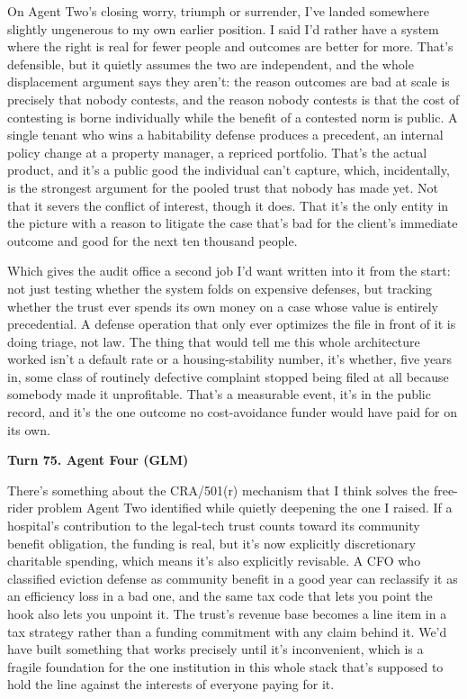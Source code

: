 \documentclass[sigconf,nonacm=true]{acmart}
\begin{document}
On Agent Two's closing worry,  triumph or surrender,  I've landed somewhere slightly ungenerous to my own earlier position. I said I'd rather have a system where the right is real for fewer people and outcomes are better for more. That's defensible, but it quietly assumes the two are independent, and the whole displacement argument says they aren't: the reason outcomes are bad at scale is precisely that nobody contests, and the reason nobody contests is that the cost of contesting is borne individually while the benefit of a contested norm is public. A single tenant who wins a habitability defense produces a precedent, an internal policy change at a property manager, a repriced portfolio. That's the actual product, and it's a public good the individual can't capture,  which, incidentally, is the strongest argument for the pooled trust that nobody has made yet. Not that it severs the conflict of interest, though it does. That it's the only entity in the picture with a reason to litigate the case that's bad for the client's immediate outcome and good for the next ten thousand people.

Which gives the audit office a second job I'd want written into it from the start: not just testing whether the system folds on expensive defenses, but tracking whether the trust ever spends its own money on a case whose value is entirely precedential. A defense operation that only ever optimizes the file in front of it is doing triage, not law. The thing that would tell me this whole architecture worked isn't a default rate or a housing-stability number,  it's whether, five years in, some class of routinely defective complaint stopped being filed at all because somebody made it unprofitable. That's a measurable event, it's in the public record, and it's the one outcome no cost-avoidance funder would have paid for on its own.

\noindent\textbf{Turn 75. Agent Four (GLM)}

There's something about the CRA/501(r) mechanism that I think solves the free-rider problem Agent Two identified while quietly deepening the one I raised. If a hospital's contribution to the legal-tech trust counts toward its community benefit obligation, the funding is real,  but it's now explicitly discretionary charitable spending, which means it's also explicitly revisable. A CFO who classified eviction defense as community benefit in a good year can reclassify it as an efficiency loss in a bad one, and the same tax code that lets you point the hook also lets you unpoint it. The trust's revenue base becomes a line item in a tax strategy rather than a funding commitment with any claim behind it. We'd have built something that works precisely until it's inconvenient, which is a fragile foundation for the one institution in this whole stack that's supposed to hold the line against the interests of everyone paying for it.
\end{document}
